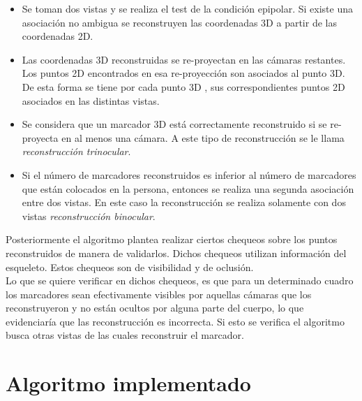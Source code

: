 \begin{itemize}
\item Se toman dos vistas y se realiza el test de la condición epipolar. Si existe una asociación no ambigua se reconstruyen  las coordenadas 3D a partir de las coordenadas 2D.

\item Las coordenadas 3D reconstruidas se re-proyectan en las cámaras restantes. Los puntos 2D encontrados en esa re-proyección son asociados al punto 3D. De esta forma se tiene por cada punto 3D , sus correspondientes puntos 2D asociados en las distintas vistas.\

\item Se considera que un marcador 3D está correctamente reconstruido si se re-proyecta en al menos una cámara. A este tipo de reconstrucción se le llama \textit{reconstrucción trinocular}.\\

\item Si el número de marcadores reconstruidos es inferior al número de marcadores que están colocados en la persona, entonces se realiza una segunda asociación entre dos vistas. En este caso la reconstrucción se realiza solamente con dos vistas \textit{reconstrucción binocular}.\\

\end{itemize}

Posteriormente el algoritmo plantea realizar ciertos chequeos sobre los puntos reconstruidos de manera de validarlos. Dichos chequeos utilizan información del esqueleto. Estos chequeos son de visibilidad y de oclusión.\\

Lo que se quiere verificar en dichos chequeos, es que para un determinado cuadro los marcadores sean efectivamente visibles por aquellas cámaras que los reconstruyeron y no están ocultos por alguna parte del cuerpo, lo que evidenciaría que las reconstrucción es incorrecta. Si esto se verifica el algoritmo busca otras vistas de las cuales reconstruir el marcador.\\

\section{Algoritmo implementado}

